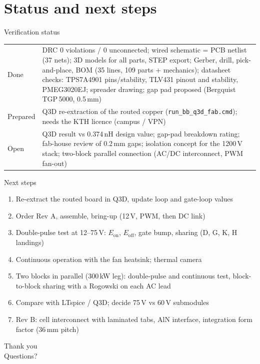 \documentclass[aspectratio=169,10pt]{beamer}
\begin{document}
\section{Status and next steps}
\begin{frame}{Verification status}
\small
\begin{tabularx}{\linewidth}{@{}lX@{}}
\toprule
Done & DRC 0 violations / 0 unconnected; wired schematic = PCB netlist (37 nets); 3D models for all parts, STEP export; Gerber, drill, pick-and-place, BOM (35 lines, 109 parts + mechanics); datasheet checks: TPS7A4901 pins/stability, TLV431 pinout and stability, PMEG3020EJ; spreader drawing; gap pad proposed (Bergquist TGP\,5000, 0.5\,mm) \\
Prepared & Q3D re-extraction of the routed copper (\texttt{run\_bb\_q3d\_fab.cmd}); needs the KTH licence (campus / VPN) \\
Open & Q3D result vs 0.374\,nH design value; gap-pad breakdown rating; fab-house review of 0.2\,mm gaps; isolation concept for the 1200\,V stack; two-block parallel connection (AC/DC interconnect, PWM fan-out) \\
\bottomrule
\end{tabularx}
\end{frame}
\begin{frame}{Next steps}
\begin{enumerate}
\item Re-extract the routed board in Q3D, update loop and gate-loop values
\item Order Rev A, assemble, bring-up (12\,V, PWM, then DC link)
\item Double-pulse test at 12--75\,V: $E_\mathrm{on}$, $E_\mathrm{off}$, gate bump, sharing (D, G, K, H landings)
\item Continuous operation with the fan heatsink; thermal camera
\item Two blocks in parallel (300\,kW leg): double-pulse and continuous test, block-to-block sharing with a Rogowski on each AC lead
\item Compare with LTspice / Q3D; decide 75\,V vs 60\,V submodules
\item Rev B: cell interconnect with laminated tabs, AlN interface, integration form factor (36\,mm pitch)
\end{enumerate}
\end{frame}
\begin{frame}[standout]
Thank you\\[1ex]
\small Questions?
\end{frame}
\end{document}
